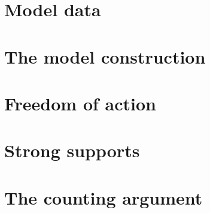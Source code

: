 \documentclass{book}
\begin{document}
\chapter{Model data}

\minitoc









\chapter{The model construction}

\minitoc




\chapter{Freedom of action}

\minitoc












\chapter{Strong supports}

\minitoc







\chapter{The counting argument}

\minitoc







\end{document}
